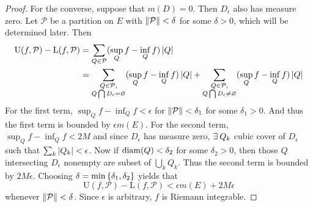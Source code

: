 \begin{proof}
    For the converse, suppose that $m(D)=0$. Then $D_\epsilon$ 
    also has measure zero. Let $\mathcal{P}$ be a partition 
    on $E$ with $\left\lVert {\mathcal{P}} \right\rVert<\delta$ for some 
    $\delta>0$, which will be determined later. Then 
    \begin{equation*}
        \begin{split}
            \mathrm{U}(f,\mathcal{P})-\mathrm{L}(f,\mathcal{P}) 
            &= \sum_{Q\in\mathcal{P}}(\sup_Q f -\inf_Q f)\left\lvert {Q} \right\rvert\\ 
            &= \sum_{\substack{Q\in\mathcal{P},\\ Q\bigcap 
            D_\epsilon = \varnothing}}(\sup_Q f -\inf_Q f)\left\lvert {Q} \right\rvert 
            + \sum_{\substack{Q\in\mathcal{P},\\ Q\bigcap 
            D_\epsilon\neq\varnothing}}(\sup_Q f -\inf_Q f)\left\lvert {Q} \right\rvert
        \end{split}
    \end{equation*}
    For the first term, $\sup_Q f -\inf_Q f < \epsilon$ for 
    $\left\lVert {\mathcal{P}} \right\rVert<\delta_1$ for some $\delta_1>0$. And 
    thus the first term is bounded by $\epsilon m(E)$. For the 
    second term, $\sup_Q f -\inf_Q f < 2M$ and since 
    $D_\epsilon$ has measure zero, $\exists\: Q_k$ cubic cover 
    of $D_\epsilon$ such that $\sum_k \left\lvert {Q_k} \right\rvert<\epsilon$. 
    Now if $\diam{Q}<\delta_2$ for some $\delta_2>0$, then 
    those $Q$ intersecting $D_\epsilon$ nonempty are subset 
    of $\bigcup_k Q_k$. Thus the second term is bounded by 
    $2M\epsilon$. Choosing $\delta = \min\left\{ {\delta_1, 
    \delta_2} \right\}$ yields that 
    \begin{equation*}
        \mathrm{U}(f,\mathcal{P})-\mathrm{L}(f,\mathcal{P}) 
        < \epsilon m(E) + 2M\epsilon
    \end{equation*}
    whenever $\left\lVert {\mathcal{P}} \right\rVert<\delta$. Since $\epsilon$ is 
    arbitrary, $f$ is Riemann integrable.
\end{proof}

